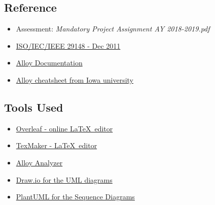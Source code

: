 \subsection{Reference}
\begin{itemize}
    \item Assessment: \textit{Mandatory Project Assignment AY 2018-2019.pdf}
    \item \href{https://ieeexplore.ieee.org/document/6146379}{ISO/IEC/IEEE 29148 - Dec 2011}
    \item \href{http://alloy.lcs.mit.edu/alloy/documentation.html}{Alloy Documentation}
    \item \href{http://homepage.cs.uiowa.edu/~tinelli/classes/181/Fall17/Notes/alloy-cheatsheet.pdf}{Alloy cheatsheet from Iowa university}
       
\end{itemize}
\subsection{Tools Used}
\begin{itemize}
    \item \href{https://it.overleaf.com/}{Overleaf - online \LaTeX\ editor}
    \item \href{http://www.xm1math.net/texmaker/}{TexMaker - \LaTeX\ editor}    
    \item \href{http://alloytools.org/}{Alloy Analyzer}
    \item \href{https://www.draw.io/}{Draw.io for the UML diagrams}
    \item \href{http://plantuml.com/}{PlantUML for the Sequence Diagrams}

\end{itemize}